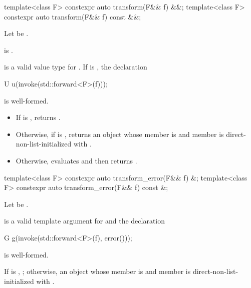 %
\begin{itemdecl}
template<class F> constexpr auto transform(F&& f) &&;
template<class F> constexpr auto transform(F&& f) const &&;
\end{itemdecl}

\begin{itemdescr}
\pnum
Let  be .

\pnum
\constraints
{} is .

\pnum
\mandates
{} is a valid value type for . If  is
, the declaration
\begin{codeblock}
U u(invoke(std::forward<F>(f)));
\end{codeblock}
is well-formed.

\pnum
\effects
\begin{itemize}
\item
If  is , returns
.
\item
Otherwise, if  is , returns an
 object whose  member is  and
 member is direct-non-list-initialized with
.
\item
Otherwise, evaluates  and then returns
.
\end{itemize}
\end{itemdescr}

%
\begin{itemdecl}
template<class F> constexpr auto transform_error(F&& f) &;
template<class F> constexpr auto transform_error(F&& f) const &;
\end{itemdecl}

\begin{itemdescr}
\pnum
Let  be .

\pnum
\mandates
{} is a valid template argument
for  and the declaration
\begin{codeblock}
G g(invoke(std::forward<F>(f), error()));
\end{codeblock}
is well-formed.

\pnum
\returns
If  is , ; otherwise, an
 object whose  member is 
and  member is direct-non-list-initialized with
.
\end{itemdescr}

